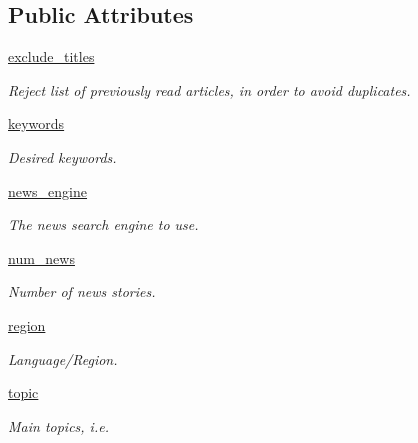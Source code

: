 \subsection*{Public Attributes}
\begin{DoxyCompactItemize}
\item 
\hyperlink{classRappCloud_1_1CloudMsgs_1_1NewsExplore_1_1NewsExplore_1_1Request_a0bb014e115957e6011018a8838c33458}{exclude\-\_\-titles}
\begin{DoxyCompactList}\small\item\em Reject list of previously read articles, in order to avoid duplicates. \end{DoxyCompactList}\item 
\hyperlink{classRappCloud_1_1CloudMsgs_1_1NewsExplore_1_1NewsExplore_1_1Request_ade6c237ad31bc5b55bb627a9f7499d71}{keywords}
\begin{DoxyCompactList}\small\item\em Desired keywords. \end{DoxyCompactList}\item 
\hyperlink{classRappCloud_1_1CloudMsgs_1_1NewsExplore_1_1NewsExplore_1_1Request_a1c42e1e823d2825802ec924b569b0e4a}{news\-\_\-engine}
\begin{DoxyCompactList}\small\item\em The news search engine to use. \end{DoxyCompactList}\item 
\hyperlink{classRappCloud_1_1CloudMsgs_1_1NewsExplore_1_1NewsExplore_1_1Request_a6db1db880296f923601b2379856a45d3}{num\-\_\-news}
\begin{DoxyCompactList}\small\item\em Number of news stories. \end{DoxyCompactList}\item 
\hyperlink{classRappCloud_1_1CloudMsgs_1_1NewsExplore_1_1NewsExplore_1_1Request_a1c7983426cd56f0c3d7b35383bf85c16}{region}
\begin{DoxyCompactList}\small\item\em Language/\-Region. \end{DoxyCompactList}\item 
\hyperlink{classRappCloud_1_1CloudMsgs_1_1NewsExplore_1_1NewsExplore_1_1Request_a3ae64ccbb66394a26021679370097752}{topic}
\begin{DoxyCompactList}\small\item\em Main topics, i.\-e. \end{DoxyCompactList}\end{DoxyCompactItemize}


